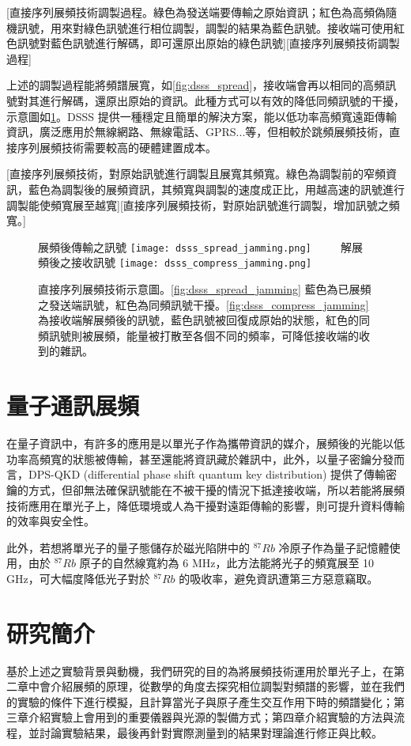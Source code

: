 \documentclass[class=NCU_thesis, crop=false]{standalone}
\begin{document}
[直接序列展頻技術調製過程。綠色為發送端要傳輸之原始資訊；紅色為高頻偽隨機訊號，用來對綠色訊號進行相位調製，調製的結果為藍色訊號。接收端可使用紅色訊號對藍色訊號進行解碼，即可還原出原始的綠色訊號][直接序列展頻技術調製過程]

上述的調製過程能將頻譜展寬，如\cref{fig:dsss_spread}，接收端會再以相同的高頻訊號對其進行解碼，還原出原始的資訊。此種方式可以有效的降低同頻訊號的干擾，示意圖如\cref{fig:dsss}。DSSS 提供一種穩定且簡單的解決方案，能以低功率高頻寬遠距傳輸資訊，廣泛應用於無線網路、無線電話、GPRS...等，但相較於跳頻展頻技術，直接序列展頻技術需要較高的硬體建置成本。

[直接序列展頻技術，對原始訊號進行調製且展寬其頻寬。綠色為調製前的窄頻資訊，藍色為調製後的展頻資訊，其頻寬與調製的速度成正比，用越高速的訊號進行調製能使頻寬展至越寬][直接序列展頻技術，對原始訊號進行調製，增加訊號之頻寬。]

\begin{figure}[!hbt]
    \centering
    \subcaptionbox
        {展頻後傳輸之訊號
        \label{fig:dsss_spread_jamming}}
        {\texttt{[image: dsss\_spread\_jamming.png]}}
    ~~~~
    \subcaptionbox
        {解展頻後之接收訊號
        \label{fig:dsss_compress_jamming}}
        {\texttt{[image: dsss\_compress\_jamming.png]}}
    \caption[直接序列展頻技術示意圖]{直接序列展頻技術示意圖。\cref{fig:dsss_spread_jamming} 藍色為已展頻之發送端訊號，紅色為同頻訊號干擾。\cref{fig:dsss_compress_jamming} 為接收端解展頻後的訊號，藍色訊號被回復成原始的狀態，紅色的同頻訊號則被展頻，能量被打散至各個不同的頻率，可降低接收端的收到的雜訊。}
    \label{fig:dsss}
\end{figure}

\section{量子通訊展頻}
在量子資訊中，有許多的應用是以單光子作為攜帶資訊的媒介，展頻後的光能以低功率高頻寬的狀態被傳輸，甚至還能將資訊藏於雜訊中\cite{belthangady2010hiding}，此外，以量子密鑰分發\cite{RevModPhys.74.145}而言，DPS-QKD (differential phase shift quantum key distribution)\cite{PhysRevLett.89.037902} 提供了傳輸密鑰的方式，但卻無法確保訊號能在不被干擾的情況下抵達接收端，所以若能將展頻技術應用在單光子上，降低環境或人為干擾對遠距傳輸的影響，則可提升資料傳輸的效率與安全性。

此外，若想將單光子的量子態儲存於磁光陷阱中的 $^{87}Rb$ 冷原子作為量子記憶體使用\cite{PhysRevLett.101.120501}，由於  $^{87}Rb$ 原子的自然線寬約為 6 MHz，此方法能將光子的頻寬展至 10 GHz，可大幅度降低光子對於 $^{87}Rb$ 的吸收率，避免資訊遭第三方惡意竊取。

\section{研究簡介}
基於上述之實驗背景與動機，我們研究的目的為將展頻技術運用於單光子上，在第二章中會介紹展頻的原理，從數學的角度去探究相位調製對頻譜的影響，並在我們的實驗的條件下進行模擬，且計算當光子與原子產生交互作用下時的頻譜變化；第三章介紹實驗上會用到的重要儀器與光源的製備方式；第四章介紹實驗的方法與流程，並討論實驗結果，最後再針對實際測量到的結果對理論進行修正與比較。
\end{document}
